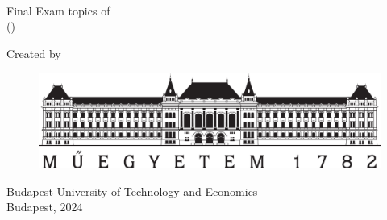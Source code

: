 
\frenchspacing
\thispagestyle{empty} %

\begin{center}
  \large{\Program} \\
  \vskip 0.25cm
  \large{\Term}
  \vskip 2cm
\end{center}

\begin{center}
  \Large{Final Exam topics of } \\
  \vskip 0.1cm
  \huge{\MakeUppercase{\textbf{\Title}}}
  \vskip 0.25cm
  \large{(\Course)}

  \vskip 3cm
  \large{Created by} \\
  \vskip 0.1cm
  \Large{\Name}
\end{center}

\begin{center}
  \mbox{}
  \vfill

  \begin{figure}[htb]
     \centering
     \includegraphics[width=0.5\linewidth]{figures/bme-logo.jpg}
  \end{figure}

  \large{Budapest University of Technology and Economics} \\
  \large{Budapest, 2024}

  \pagebreak
  \setcounter{page}{1}
\end{center}
